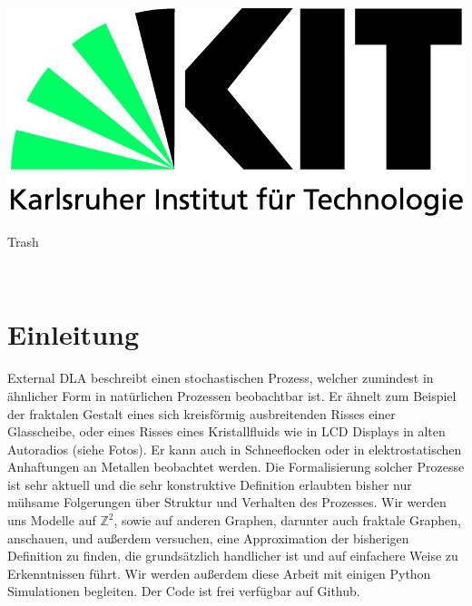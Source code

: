 \documentclass[12pt,a4paper]{scrartcl}
\numberwithin{equation}{subsection}
\newcommand{\1}{\mathbbm{1}}
\numberwithin{equation}{section}
\theoremstyle{definition}
\begin{document}
	\pagestyle{empty}

\begin{titlepage}

	\includegraphics[scale=0.45]{kit-logo.jpg} 
    \vspace*{2cm} 
\begin{center} \large 
    
   Trash
\end{center}
\end{titlepage}

\newpage

\newpage
\phantom \\
\newpage

\tableofcontents %

 	\pagestyle{headings}

\setcounter{page}{1}

\newpage
\section{Einleitung}
External DLA beschreibt einen stochastischen Prozess, welcher zumindest in ähnlicher Form in natürlichen Prozessen beobachtbar ist. Er ähnelt zum Beispiel der fraktalen Gestalt eines sich kreisförmig ausbreitenden Risses einer Glasscheibe, oder eines Risses eines Kristallfluids wie in LCD Displays in alten Autoradios (siehe Fotos). Er kann auch in Schneeflocken oder in elektrostatischen Anhaftungen an Metallen beobachtet werden. Die Formalisierung solcher Prozesse ist sehr aktuell und die sehr konstruktive Definition erlaubten bisher nur mühsame Folgerungen über Struktur und Verhalten des Prozesses. Wir werden uns Modelle auf $\mathbb{Z}^2$, sowie auf anderen Graphen, darunter auch fraktale Graphen, anschauen, und außerdem versuchen, eine Approximation der bisherigen Definition zu finden, die grundsätzlich handlicher ist und auf einfachere Weise zu Erkenntnissen führt. Wir werden außerdem diese Arbeit mit einigen Python Simulationen begleiten. Der Code ist frei verfügbar auf Github. \\
\\
\end{document}
